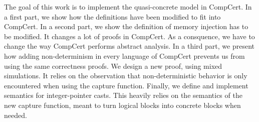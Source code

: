 The goal of this work is to implement the quasi-concrete model in CompCert.
In a first part, we show how the definitions have been modified to fit into CompCert.
In a second part, we show the definition of memory injection has to be modified. It changes a lot of proofs in CompCert. As a consquence, we have to change the way CompCert performs abstract analysis.
In a third part, we present how adding non-determinism in every language of CompCert prevents us from using the same correctness proofs. We design a new proof, using mixed simulations. It relies on the observation that non-deterministic behavior is only encountered when using the capture function.
Finally, we define and implement semantics for integer-pointer casts. This heavily relies on the semantics of the new capture function, meant to turn logical blocks into concrete blocks when needed.
